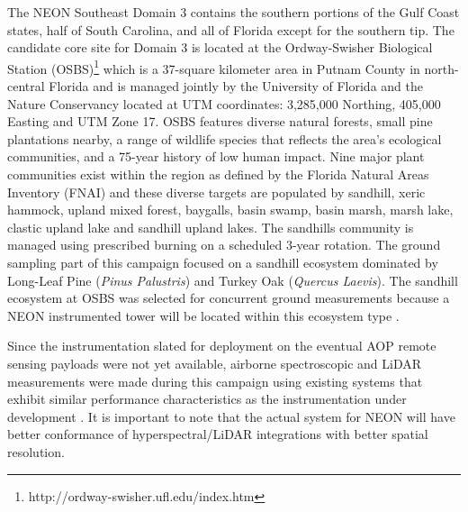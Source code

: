 \documentclass[remotesensing,article,accept,moreauthors,pdftex,12pt,a4paper]{mdpi}
\begin{document}
The NEON Southeast Domain 3 contains the southern portions of the Gulf Coast states, half of South Carolina, and all of Florida except for the southern tip. 
The candidate core site for Domain 3 is located at the Ordway-Swisher Biological Station (OSBS)\footnote{http://ordway-swisher.ufl.edu/index.htm} which is a 37-square kilometer area in Putnam County in north-central Florida and is managed jointly by the University of Florida and the Nature Conservancy located at UTM coordinates: 3,285,000 Northing, 405,000 Easting and UTM Zone 17. 
OSBS features diverse natural forests, small pine plantations nearby, a range of wildlife species that reflects the area's ecological communities, and a 75-year history of low human impact.  
Nine major plant communities exist within the region as defined by the Florida Natural Areas Inventory (FNAI) and these diverse targets are populated by sandhill, xeric hammock, upland mixed forest, baygalls, basin swamp, basin marsh, marsh lake, clastic upland lake and sandhill upland lakes. 
The sandhills community is managed using prescribed burning on a scheduled 3-year rotation. 
The ground sampling part of this campaign focused on a sandhill ecosystem dominated by Long-Leaf Pine (\textit{Pinus Palustris}) and Turkey Oak (\textit{Quercus Laevis}). 
The sandhill ecosystem at OSBS was selected for concurrent ground measurements because a NEON instrumented tower will be located within this ecosystem type \cite{neon2010aopdatarelease, kampea2010aop}.

Since the instrumentation slated for deployment on the eventual AOP remote sensing payloads were not yet available, airborne spectroscopic and LiDAR measurements were made during this campaign using existing systems that exhibit similar performance characteristics as the instrumentation under development \cite{kampea2010aop}. 
It is important to note that the actual system for NEON will have better conformance of hyperspectral/LiDAR integrations with better spatial resolution.
\end{document}
